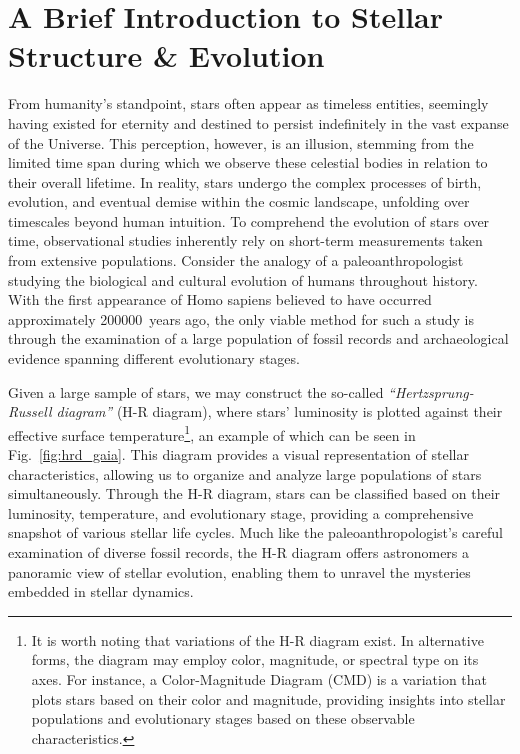 \documentclass[main.tex]{subfiles}
\begin{document}
    
    {
    \adjustmtc
    \adjustmtc
    \minitoc
    \newpage
    }
    
    
    
    \section{A Brief Introduction to Stellar Structure \& Evolution}\label{sec:ch1:intro}
    From humanity's standpoint, stars often appear as timeless entities, seemingly having existed for eternity and destined to persist indefinitely in the vast expanse of the Universe. This perception, however, is an illusion, stemming from the limited time span during which we observe these celestial bodies in relation to their overall lifetime. In reality, stars undergo the complex processes of birth, evolution, and eventual demise within the cosmic landscape, unfolding over timescales beyond human intuition. To comprehend the evolution of stars over time, observational studies inherently rely on short-term measurements taken from extensive populations.
    Consider the analogy of a paleoanthropologist studying the biological and cultural evolution of humans throughout history. With the first appearance of Homo sapiens believed to have occurred approximately \SI{200000}{years} ago, the only viable method for such a study is through the examination of a large population of fossil records and archaeological evidence spanning different evolutionary stages.

    Given a large sample of stars, we may construct the so-called \textit{``Hertzsprung-Russell diagram''} (H-R diagram), where stars' luminosity is plotted against their effective surface temperature\footnote{It is worth noting that variations of the H-R diagram exist. In alternative forms, the diagram may employ color, magnitude, or spectral type on its axes. For instance, a Color-Magnitude Diagram (CMD) is a variation that plots stars based on their color and magnitude, providing insights into stellar populations and evolutionary stages based on these observable characteristics.}, an example of which can be seen in Fig.~\ref{fig:hrd_gaia}. This diagram provides a visual representation of stellar characteristics, allowing us to organize and analyze large populations of stars simultaneously. Through the H-R diagram, stars can be classified based on their luminosity, temperature, and evolutionary stage, providing a comprehensive snapshot of various stellar life cycles. Much like the paleoanthropologist's careful examination of diverse fossil records, the H-R diagram offers astronomers a panoramic view of stellar evolution, enabling them to unravel the mysteries embedded in stellar dynamics.
\end{document}
